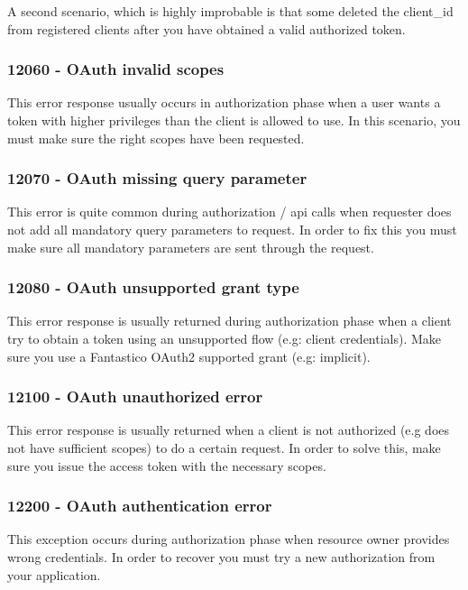 \documentclass[letterpaper,10pt,english]{sphinxmanual}
\begin{document}
A second scenario, which is highly improbable is that some deleted the client\_id from registered clients after you have obtained
a valid authorized token.


\subsubsection{12060 - OAuth invalid scopes}
\label{features/oauth2/exceptions/12060:oauth-invalid-scopes}\label{features/oauth2/exceptions/12060::doc}
This error response usually occurs in authorization phase when a user wants a token with higher privileges than the client is
allowed to use. In this scenario, you must make sure the right scopes have been requested.


\subsubsection{12070 - OAuth missing query parameter}
\label{features/oauth2/exceptions/12070:oauth-missing-query-parameter}\label{features/oauth2/exceptions/12070::doc}
This error is quite common during authorization / api calls when requester does not add all mandatory query parameters to request.
In order to fix this you must make sure all mandatory parameters are sent through the request.


\subsubsection{12080 - OAuth unsupported grant type}
\label{features/oauth2/exceptions/12080:oauth-unsupported-grant-type}\label{features/oauth2/exceptions/12080::doc}
This error response is usually returned during authorization phase when a client try to obtain a token using an unsupported flow
(e.g: client credentials). Make sure you use a Fantastico OAuth2 supported grant (e.g: implicit).


\subsubsection{12100 - OAuth unauthorized error}
\label{features/oauth2/exceptions/12100:oauth-unauthorized-error}\label{features/oauth2/exceptions/12100::doc}
This error response is usually returned when a client is not authorized (e.g does not have sufficient scopes) to do a certain
request. In order to solve this, make sure you issue the access token with the necessary scopes.


\subsubsection{12200 - OAuth authentication error}
\label{features/oauth2/exceptions/12200:oauth-authentication-error}\label{features/oauth2/exceptions/12200::doc}
This exception occurs during authorization phase when resource owner provides wrong credentials. In order to recover you must
try a new authorization from your application.
\end{document}
